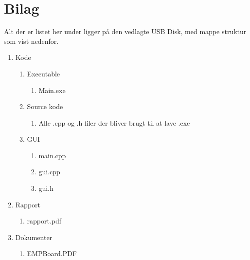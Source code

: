 \appendix
\section{Bilag} \hfill
Alt der er listet her under ligger på den vedlagte USB Disk, med mappe struktur som vist nedenfor.
\label{sec:bilag}
\begin{enumerate}[noitemsep]
	\item Kode
	\begin{enumerate}[noitemsep]
		\item Executable
		\begin{enumerate}[noitemsep]
			\item Main.exe
		\end{enumerate}
		\item Source kode
		\begin{enumerate}[noitemsep]
			\item Alle .cpp og .h filer der bliver brugt til at lave .exe
		\end{enumerate}
		\item GUI
		\begin{enumerate}[noitemsep]
			\item main.cpp
			\item gui.cpp
			\item gui.h
		\end{enumerate}
	\end{enumerate}
	\item Rapport
	\begin{enumerate}[noitemsep]
		\item rapport.pdf
	\end{enumerate}
	\item Dokumenter
	\begin{enumerate}[noitemsep]
		\item EMPBoard.PDF \label{itm:empboard}
	\end{enumerate}
\end{enumerate}